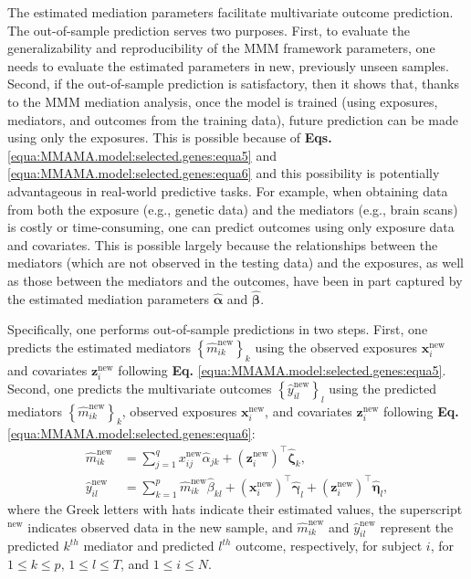 \documentclass[
  12pt]{article}
\def\X{\mathbf{x}}
\def\Z{\mathbf{z}}
\begin{document}
The estimated mediation parameters facilitate multivariate outcome prediction. The out-of-sample prediction serves two purposes. First, to evaluate the generalizability and reproducibility of the MMM framework parameters, one needs to evaluate the estimated parameters in new, previously unseen samples. Second, if the out-of-sample prediction is satisfactory, then it shows that, thanks to the MMM mediation analysis, once the model is trained (using exposures, mediators, and outcomes from the training data), future prediction can be made using only the exposures. This is possible because of \textbf{Eqs.} \eqref{equa:MMAMA.model:selected.genes:equa5} and \eqref{equa:MMAMA.model:selected.genes:equa6} and this possibility is  potentially advantageous in real-world predictive tasks. For example, when obtaining data from both the exposure (e.g., genetic data) and the mediators (e.g., brain scans) is costly or time-consuming, one can predict outcomes using only exposure data and covariates. This is possible largely because the relationships between the mediators (which are not observed in the testing data) and the exposures, as well as those between the mediators and the outcomes, have been in part captured by the estimated mediation parameters $\hat{\bm{\alpha}}$ and $\hat{\bm{\beta}}$.


Specifically, one performs out-of-sample predictions in two steps. First, one predicts the estimated mediators $\left \{ \hat{m}_{ik}^{\text{new}} \right \}_k$ using the observed exposures $\mathbf{x}_i^{\text{new}}$ and covariates $\mathbf{z}_i^{\text{new}}$ following \textbf{Eq.} \ref{equa:MMAMA.model:selected.genes:equa5}. Second, one predicts the multivariate outcomes $\left \{ \hat{y}_{il}^{\text{new}} \right \}_l$ using the predicted mediators $\left \{ \hat{m}_{ik}^{\text{new}} \right \}_k$, observed exposures $\mathbf{x}_i^{\text{new}}$, and covariates $\mathbf{z}_i^{\text{new}}$ following \textbf{Eq.} \ref{equa:MMAMA.model:selected.genes:equa6}:
\begin{align}
	\hat{m}_{ik}^{\text{new}}
\label{equa:MMAMA.model:selected.genes:equa5}
    &=
    \sum_{j=1}^q x_{ij}^{\text{new}}  \hat{\alpha}_{jk}
    +  (\Z_{i}^{\text{new}})^{\top}  \hat{\bm{\zeta}}_{k},\\
	\hat{y}_{il}^{\text{new}}
    &=
	\label{equa:MMAMA.model:selected.genes:equa6}
    \sum_{k=1}^p \hat{m}_{ik}^{\text{new}} \hat{\beta}_{kl}
    +
    (\X_{i}^{\text{new}})^{\top} \hat{\bm{\gamma}}_{l}
    +
     (\Z_{i}^{\text{new}})^{\top} \hat{\bm{\eta}}_{l},
\end{align}
where the Greek letters with hats indicate their estimated values, the superscript $^{\text{new}}$ indicates observed data in the new sample, and $\hat{m}_{ik}^{\text{new}}$ and $\hat{y}_{il}^{\text{new}}$ represent the predicted $k^{th}$ mediator and predicted $l^{th}$ outcome, respectively, for subject $i$, for $1 \le k \le p$, $1 \le l \le T$, and $1 \le i \le N$.
\end{document}
